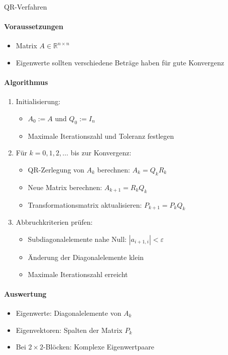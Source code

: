 \begin{KR}{QR-Verfahren}
\paragraph{Voraussetzungen}
\begin{itemize}
    \item Matrix $A \in \mathbb{R}^{n \times n}$
    \item Eigenwerte sollten verschiedene Beträge haben für gute Konvergenz
\end{itemize}

\paragraph{Algorithmus}
\begin{enumerate}
    \item Initialisierung:
    \begin{itemize}
        \item $A_0 := A$ und $Q_0 := I_n$
        \item Maximale Iterationszahl und Toleranz festlegen
    \end{itemize}

    \item Für $k = 0,1,2,\ldots$ bis zur Konvergenz:
    \begin{itemize}
        \item QR-Zerlegung von $A_k$ berechnen: $A_k = Q_kR_k$
        \item Neue Matrix berechnen: $A_{k+1} = R_kQ_k$
        \item Transformationsmatrix aktualisieren: $P_{k+1} = P_kQ_k$
    \end{itemize}

    \item Abbruchkriterien prüfen:
    \begin{itemize}
        \item Subdiagonalelemente nahe Null: $|a_{i+1,i}| < \varepsilon$
        \item Änderung der Diagonalelemente klein
        \item Maximale Iterationszahl erreicht
    \end{itemize}
\end{enumerate}

\paragraph{Auswertung}
\begin{itemize}
    \item Eigenwerte: Diagonalelemente von $A_k$
    \item Eigenvektoren: Spalten der Matrix $P_k$
    \item Bei $2\times2$-Blöcken: Komplexe Eigenwertpaare
\end{itemize}
\end{KR}

